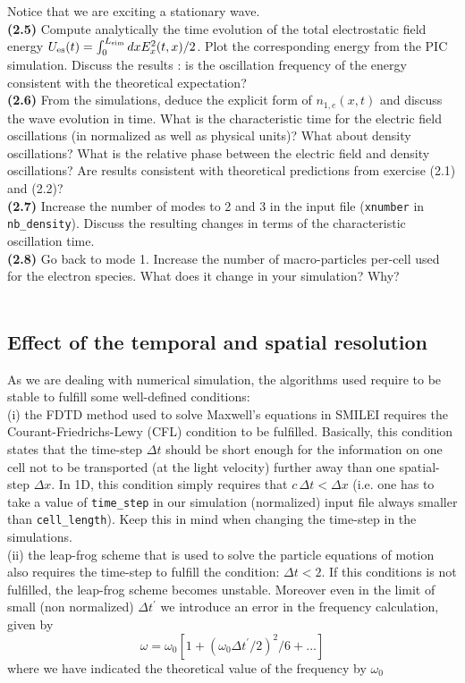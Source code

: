 \documentclass[10pt]{article}
\begin{document}
Notice that we are exciting a stationary wave. \\
{\bf (2.5)} Compute analytically the time evolution of the total electrostatic field energy $U_{\rm es}(t) = \int_{0}^{L_{\rm sim}} dx E_x^2(t,x)/2$. Plot the corresponding energy from the PIC simulation. Discuss the results : is the oscillation frequency of the energy consistent with the theoretical expectation?\\
{\bf (2.6)} From the simulations, deduce the explicit form of $n_{1,e}(x,t)$ and discuss the wave evolution in time. What is the characteristic time for the electric field oscillations (in normalized as well as physical units)? What about density oscillations? What is the relative phase between the electric field and density oscillations?  Are results consistent with theoretical predictions from exercise (2.1) and (2.2)?\\
{\bf (2.7)} Increase the number of modes to 2 and 3 in the input file (\texttt{xnumber} in \texttt{nb\_density}). Discuss the resulting changes in terms of the characteristic oscillation time.\\
{\bf (2.8)} Go back to mode 1. Increase the number of macro-particles per-cell used for the electron species. What does it change in your simulation? Why?\\
 \\

\subsection{Effect of the temporal and spatial resolution}

As we are dealing with numerical simulation, the algorithms used require to be stable to fulfill some well-defined conditions:\\
(i) the FDTD method used to solve Maxwell's equations in SMILEI requires the Courant-Friedrichs-Lewy (CFL) condition to be fulfilled. Basically, this condition states that the time-step $\Delta t$ should be short enough for the information on one cell not to be transported (at the light velocity) further away than one spatial-step $\Delta x$. In 1D, this condition simply requires that $c\,\Delta t < \Delta x$ (i.e. one has to take a value of \texttt{time\_step} in our simulation (normalized) input file always smaller than \texttt{cell\_length}). Keep this in mind when changing the time-step in the simulations.\\
(ii) the leap-frog scheme that is used to solve the particle equations of motion also requires the time-step to fulfill the condition: $\Delta t < 2$. If this conditions is not fulfilled, the leap-frog scheme becomes unstable.
Moreover even in the limit of small (non normalized) $\Delta t^\prime$ we introduce an error in the frequency calculation, given by 
$$\omega = \omega_0  [1+ (\omega_0 \Delta t^\prime/2 )^2/6+... ]$$
where we have indicated the theoretical value of the frequency  by $\omega_0$
\end{document}
